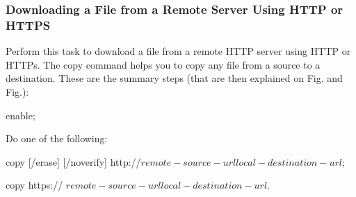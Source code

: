 \subsubsection{Downloading a File from a Remote Server Using HTTP or HTTPS}
Perform this task to download a file from a remote HTTP server using HTTP or HTTPs. The copy command helps you to copy any file from a source to a destination. These are the summary steps (that are then explained on Fig. and Fig.):

\begin{enum-c}
\item enable;
\item Do one of the following:
	\begin{item-c}
	\item copy [/erase] [/noverify] http://$remote-source-urllocal-destination-url$;
	\item copy https:// $remote-source-url local-destination-url$.
	\end{item-c}
\end{enum-c}

